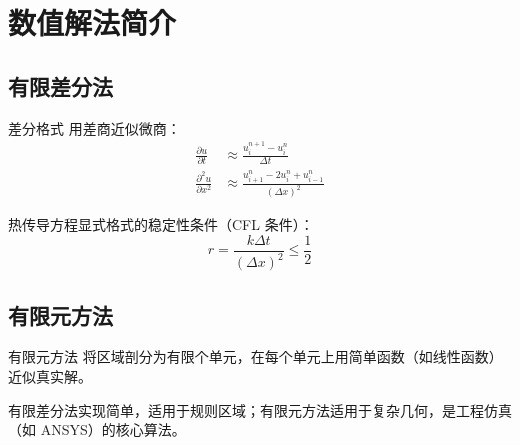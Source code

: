 ﻿\chapter{数值解法简介}

\section{有限差分法}

\begin{mydefinition}{差分格式}
用差商近似微商：
\begin{align*}
\frac{\partial u}{\partial t}&\approx\frac{u^{n+1}_i-u^n_i}{\Delta t}\\
\frac{\partial^2 u}{\partial x^2}&\approx\frac{u^n_{i+1}-2u^n_i+u^n_{i-1}}{(\Delta x)^2}
\end{align*}
\end{mydefinition}

\begin{theorem}[稳定性条件]
热传导方程显式格式的稳定性条件（CFL 条件）：
\[
r=\frac{k\Delta t}{(\Delta x)^2}\leq\frac{1}{2}
\]
\end{theorem}

\section{有限元方法}

\begin{mydefinition}{有限元方法}
将区域剖分为有限个单元，在每个单元上用简单函数（如线性函数）近似真实解。
\end{mydefinition}

\begin{remark}
有限差分法实现简单，适用于规则区域；有限元方法适用于复杂几何，是工程仿真（如 ANSYS）的核心算法。
\end{remark}
